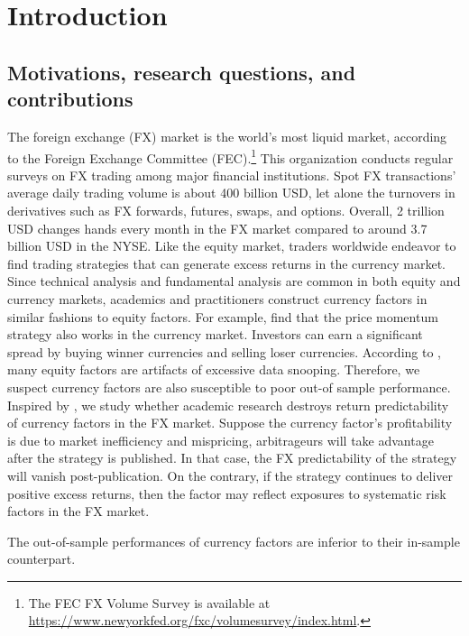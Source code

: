\documentclass[12pt,a4paper]{article}
\begin{document}
\section{Introduction}
\label{sec:BG}

\subsection{Motivations, research questions, and contributions}

The foreign exchange (FX) market is the world’s most liquid market, according to the Foreign
Exchange Committee (FEC).\footnote{The FEC FX Volume Survey is available at \url{https://www.newyorkfed.org/fxc/volumesurvey/index.html}.} This organization conducts regular surveys on FX trading
among major financial institutions. Spot FX transactions’ average daily trading volume is
about 400 billion USD, let alone the turnovers in derivatives such as FX forwards, futures,
swaps, and options. Overall, 2 trillion USD changes hands every month in the FX market
compared to around 3.7 billion USD in the NYSE.
Like the equity market, traders worldwide endeavor to find trading strategies that can
generate excess returns in the currency market. Since technical analysis and fundamental
analysis are common in both equity and currency markets, academics and practitioners
construct currency factors in similar fashions to equity factors. For example, \citet*{MSSS2012} find that the price momentum strategy \citep*{JT1993} also works in the currency market. Investors can earn a significant spread by
buying winner currencies and selling loser currencies.
According to  \citet*{HLZ2016}, many equity factors are artifacts of excessive
data snooping. Therefore, we suspect currency factors are also susceptible to poor out-of sample performance. Inspired by \citet*{MP2016}, we study whether
academic research destroys return predictability of currency factors in the FX market. Suppose the currency
factor’s profitability is due to market inefficiency and mispricing, arbitrageurs will take
advantage after the strategy is published. In that case, the
FX predictability of the strategy will vanish post-publication. On the contrary, if the strategy continues to 
deliver positive excess returns, then the factor may reflect exposures to systematic risk factors in the FX market. 


\begin{basedescript}{\desclabelstyle{\pushlabel}\desclabelwidth{7em}}
	\item[Hypothesis 1:]
	The out-of-sample performances of currency factors are inferior to their in-sample counterpart.	
\end{basedescript}
\end{document}
